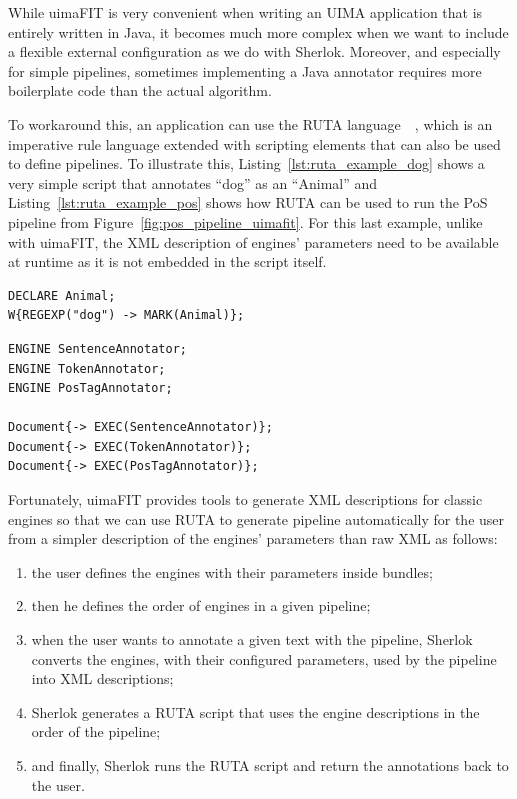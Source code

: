 \documentclass{article}
\begin{document}
While uimaFIT is very convenient when writing an UIMA application that is entirely written in Java,
it becomes much more complex when we want to include a flexible external configuration as we do with
Sherlok. Moreover, and especially for simple pipelines, sometimes implementing a Java annotator
requires more boilerplate code than the actual algorithm.

To workaround this, an application can use the RUTA language~\cite{ruta}~\cite{ruta_2014}, which is
an imperative rule language extended with scripting elements that can also be used to define
pipelines. To illustrate this, Listing~\ref{lst:ruta_example_dog} shows a very simple script that
annotates ``dog'' as an ``Animal'' and Listing~\ref{lst:ruta_example_pos} shows how RUTA can be used
to run the PoS pipeline from Figure~\ref{fig:pos_pipeline_uimafit}. For this last example, unlike
with uimaFIT, the XML description of engines' parameters need to be available at runtime as it is
not embedded in the script itself.

\begin{lstlisting}[float,language=ruta,
                   caption=A basic RUTA script,
                   label=lst:ruta_example_dog]
DECLARE Animal;
W{REGEXP("dog") -> MARK(Animal)};
\end{lstlisting}

\begin{lstlisting}[float,language=ruta,
                   caption=PoS pipeline written in RUTA,
                   label=lst:ruta_example_pos]
ENGINE SentenceAnnotator;
ENGINE TokenAnnotator;
ENGINE PosTagAnnotator;

Document{-> EXEC(SentenceAnnotator)};
Document{-> EXEC(TokenAnnotator)};
Document{-> EXEC(PosTagAnnotator)};
\end{lstlisting}

Fortunately, uimaFIT provides tools to generate XML descriptions for classic engines so that we can
use RUTA to generate pipeline automatically for the user from a simpler description of the engines'
parameters than raw XML as follows:

\begin{enumerate}
    \item the user defines the engines with their parameters inside bundles;
    \item then he defines the order of engines in a given pipeline;
    \item when the user wants to annotate a given text with the pipeline, Sherlok converts the
        engines, with their configured parameters, used by the pipeline into XML descriptions;
    \item Sherlok generates a RUTA script that uses the engine descriptions in the order of the
        pipeline;
    \item and finally, Sherlok runs the RUTA script and return the annotations back to the user.
\end{enumerate}
\end{document}
